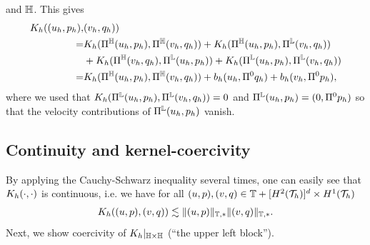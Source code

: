 \documentclass[pdflatex,sn-mathphys,Numbered]{sn-jnl}%
\theoremstyle{remark}%
\theoremstyle{definition}%
\begin{document}
and $\mathbb{H}$. This gives
\begin{align} \label{eq::K_on_TT}
  \Kh((u_h,p_h),&(v_h,q_h)) \nonumber \\ =
&\Kh(\Pi^\HH(u_h,p_h),\Pi^\HH(v_h,q_h)) + \Kh(\Pi^{\HH}(u_h,p_h),\Pi^\LL(v_h,q_h)) \nonumber \\
&+ \Kh(\Pi^{\HH}(v_h,q_h),\Pi^\LL(u_h,p_h)) + \Kh(\Pi^{\LL}(u_h,p_h),\Pi^\LL(v_h,q_h)) \nonumber \\ %
  =& \Kh(\Pi^\HH(u_h,p_h),\Pi^\HH(v_h,q_h)) + b_h(u_h,\Pi^0 q_h) + b_h(v_h,\Pi^0p_h),
\end{align}
where we used that $K_h(\Pi^{\mathbb{L}}(u_h,p_h),\Pi^{\mathbb{L}}(v_h,q_h)) = 0$ and $\Pi^{\mathbb{L}}(u_h,p_h) = (0,\Pi^0 p_h)$ so that the velocity contributions of $\Pi^{\mathbb{L}}(u_h,p_h)$ vanish.

\subsection{Continuity and kernel-coercivity}
By applying the Cauchy-Schwarz inequality several times, one can easily see that $K_h(\cdot,\cdot)$ is continuous, i.e. 
we have for all $(u,p), (v,q) \in \mathbb{T} + [H^{2}({\mathcal{T}_h})]^d \times H^1({\mathcal{T}_h})$
\begin{align} \label{eq:Khcontinuity}
    K_h((u,p),(v,q)) \lesssim \Vert (u,p) \Vert_{\mathbb{T},\ast} \Vert (v,q) \Vert_{\mathbb{T}, \ast}.
\end{align}
Next, we show coercivity of $K_h|_{\mathbb{H} \times \mathbb{H}}$ (``the upper left
block''). 
\end{document}
